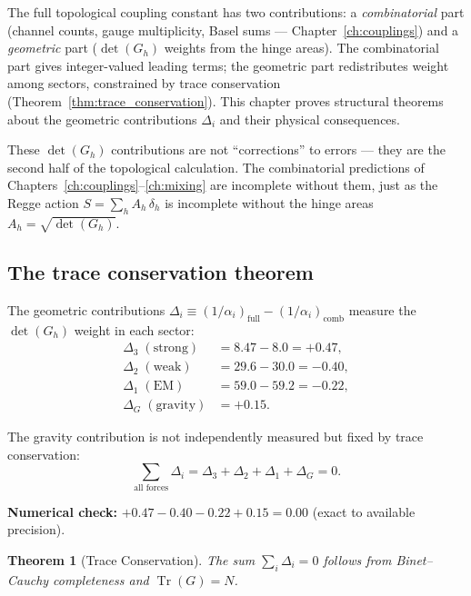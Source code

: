 \documentclass[12pt]{article}
\newtheorem{theorem}{Theorem}[section]
\theoremstyle{remark}
\theoremstyle{definition}
\begin{document}
The full topological coupling constant has two contributions: a \emph{combinatorial} part (channel counts, gauge multiplicity, Basel sums --- Chapter~\ref{ch:couplings}) and a \emph{geometric} part ($\det(G_h)$ weights from the hinge areas). The combinatorial part gives integer-valued leading terms; the geometric part redistributes weight among sectors, constrained by trace conservation (Theorem~\ref{thm:trace_conservation}). This chapter proves structural theorems about the geometric contributions $\Delta_i$ and their physical consequences.

These $\det(G_h)$ contributions are not ``corrections'' to errors --- they are the second half of the topological calculation. The combinatorial predictions of Chapters~\ref{ch:couplings}--\ref{ch:mixing} are incomplete without them, just as the Regge action $S = \sum_h A_h\,\delta_h$ is incomplete without the hinge areas $A_h = \sqrt{\det(G_h)}$.

\subsection{The trace conservation theorem}

The geometric contributions $\Delta_i \equiv (1/\alpha_i)_\text{full} - (1/\alpha_i)_\text{comb}$ measure the $\det(G_h)$ weight in each sector:
\begin{align}
\Delta_3 \;(\text{strong}) &= 8.47 - 8.0 = +0.47, \\
\Delta_2 \;(\text{weak}) &= 29.6 - 30.0 = -0.40, \\
\Delta_1 \;(\text{EM}) &= 59.0 - 59.2 = -0.22, \\
\Delta_G \;(\text{gravity}) &= +0.15.
\end{align}

The gravity contribution is not independently measured but fixed by trace conservation:
\begin{equation}
\boxed{\sum_{\text{all forces}} \Delta_i = \Delta_3 + \Delta_2 + \Delta_1 + \Delta_G = 0.}
\label{eq:ghost_sum}
\end{equation}

\textbf{Numerical check:} $+0.47 - 0.40 - 0.22 + 0.15 = 0.00$ (exact to available precision).

\begin{theorem}[Trace Conservation]
The sum $\sum_i \Delta_i = 0$ follows from Binet--Cauchy completeness and $\operatorname{Tr}(G) = N$.
\end{theorem}
\end{document}
